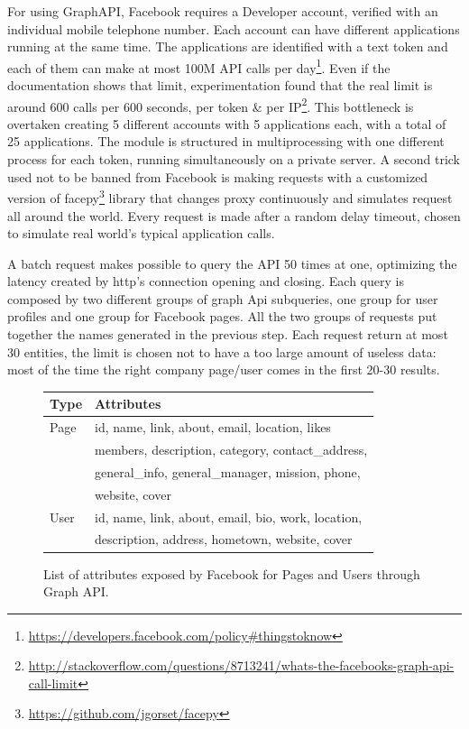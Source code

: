 For using GraphAPI, Facebook requires a Developer account, verified with an individual mobile telephone number. Each account can have different applications running at the same time. The applications are identified with a text token and each of them can make at most 100M API calls per day\footnote{\url{https://developers.facebook.com/policy#thingstoknow}}. Even if the documentation shows that limit, experimentation found that the real limit is around 600 calls per 600 seconds, per token & per IP\footnote{\url{http://stackoverflow.com/questions/8713241/whats-the-facebooks-graph-api-call-limit}}. This bottleneck is overtaken creating 5 different accounts with 5 applications each, with a total of 25 applications.
The module is structured in multiprocessing with one different process for each token, running simultaneously on a private server. A second trick used not to be banned from Facebook is making requests with a customized version of facepy\footnote{\url{https://github.com/jgorset/facepy}} library that changes proxy continuously and simulates request all around the world. Every request is made after a random delay timeout, chosen to simulate real world's typical application calls.


A batch request makes possible to query the API 50 times at one, optimizing the latency created by http's connection opening and closing.  Each query is composed by two different groups of graph Api subqueries, one group for user profiles and one group for Facebook pages. All the two groups of requests put together the names generated in the previous step. Each request return at most 30 entities, the limit is chosen not to have a too large amount of useless data: most of the time the right company page/user comes in the first 20-30 results.

\begin{figure}
\begin{tabular}{| l | l |}
    \hline
    Type & Attributes \\ \hline
    Page & id, name, link, about, email, location, likes\\
         & members, description, category, contact\_address,\\
         & general\_info, general\_manager, mission, phone,\\
         & website, cover\\
    \hline
    User & id, name, link, about, email, bio, work, location,\\
         & description, address, hometown, website, cover\\
    \hline
\end{tabular}
    \caption{List of attributes exposed by Facebook for Pages and Users through Graph API.}
    \label{Fig.3}
\end{figure}

